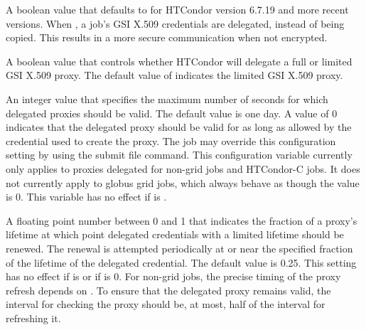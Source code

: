 \begin{description}
\label{param:DelegateJobGSICredentials} 
\item[\Macro{DELEGATE\_JOB\_GSI\_CREDENTIALS}]
  A boolean value that defaults to  for HTCondor version 6.7.19
  and more recent versions.
  When , a job's GSI X.509 credentials are delegated,
  instead of being copied.
  This results in a more secure communication when not encrypted.

\label{param:DelegateFullJobGSICredentials} 
\item[\Macro{DELEGATE\_FULL\_JOB\_GSI\_CREDENTIALS}]
  A boolean value that controls whether HTCondor will delegate a full or limited
  GSI X.509 proxy.  
  The default value of  indicates the limited GSI X.509 proxy.

\label{param:DelegateJobGSICredentialsLifetime}
\item[\Macro{DELEGATE\_JOB\_GSI\_CREDENTIALS\_LIFETIME}]
  An integer value that specifies the maximum number of seconds for
  which delegated proxies should be valid.  
  The default value is one day.
  A value of 0 indicates that the delegated proxy should be valid for as
  long as allowed by the credential used to create the proxy.  
  The job may override this configuration setting by using the
   submit file
  command.  This configuration variable currently only applies to
  proxies delegated for non-grid jobs and HTCondor-C jobs.  It does not
  currently apply to globus grid jobs, which always behave as though
  the value is 0.
  This variable has no effect if 
  is .

\label{param:DelegateJobGSICredentialsRefresh}
\item[\Macro{DELEGATE\_JOB\_GSI\_CREDENTIALS\_REFRESH}]
  A floating point number between 0 and 1 that indicates the fraction of 
  a proxy's lifetime at which point delegated
  credentials with a limited lifetime should be renewed.  
  The renewal is attempted periodically at or near the specified fraction
  of the lifetime of the delegated credential.  
  The default value is 0.25.
  This setting has no effect if  is 
   or if
   is 0.  
  For non-grid jobs, the precise timing of the proxy refresh depends on
  .  
  To ensure that the delegated proxy remains valid, 
  the interval for checking the proxy should be,
  at most, half of the interval for refreshing it.


\end{description}
